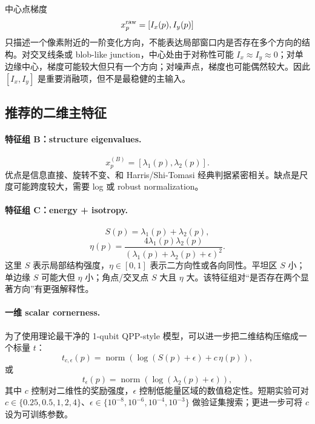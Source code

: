 \documentclass[UTF8,zihao=-4]{ctexart}
\begin{document}
中心点梯度
\begin{equation}
    x_p^{\rm raw}=[I_x(p),I_y(p)]
\end{equation}
只描述一个像素附近的一阶变化方向，不能表达局部窗口内是否存在多个方向的结构。对交叉线条或 blob-like junction，中心处由于对称性可能 $I_x\approx I_y\approx 0$；对单边缘中心，梯度可能较大但只有一个方向；对噪声点，梯度也可能偶然较大。因此 $[I_x,I_y]$ 是重要消融项，但不是最稳健的主输入。

\subsection{推荐的二维主特征}

\paragraph{特征组 B：structure eigenvalues.}
\begin{equation}
    x_p^{(B)}=[\lambda_1(p),\lambda_2(p)].
\end{equation}
优点是信息直接、旋转不变、和 Harris/Shi-Tomasi 经典判据紧密相关。缺点是尺度可能跨度较大，需要 log 或 robust normalization。

\paragraph{特征组 C：energy + isotropy.}
\begin{equation}
    S(p)=\lambda_1(p)+\lambda_2(p),
\end{equation}
\begin{equation}
    \eta(p)=\frac{4\lambda_1(p)\lambda_2(p)}{(\lambda_1(p)+\lambda_2(p)+\epsilon)^2}.
\end{equation}
这里 $S$ 表示局部结构强度，$\eta\in[0,1]$ 表示二方向性或各向同性。平坦区 $S$ 小；单边缘 $S$ 可能大但 $\eta$ 小；角点/交叉点 $S$ 大且 $\eta$ 大。该特征组对“是否存在两个显著方向”有更强解释性。

\paragraph{一维 scalar cornerness.}
为了使用理论最干净的 1-qubit QPP-style 模型，可以进一步把二维结构压缩成一个标量 $t$：
\begin{equation}
    t_{c,\epsilon}(p)=\operatorname{norm}\left(\log(S(p)+\epsilon)+c\,\eta(p)\right),
\end{equation}
或
\begin{equation}
    t_{\epsilon}(p)=\operatorname{norm}\left(\log(\lambda_2(p)+\epsilon)\right),
\end{equation}
其中 $c$ 控制对二维性的奖励强度，$\epsilon$ 控制低能量区域的数值稳定性。短期实验可对 $c\in\{0.25,0.5,1,2,4\}$、$\epsilon\in\{10^{-8},10^{-6},10^{-4},10^{-3}\}$ 做验证集搜索；更进一步可将 $c$ 设为可训练参数。
\end{document}
